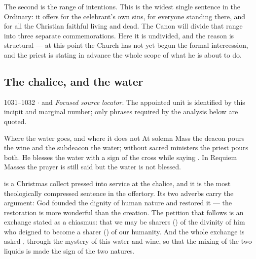 The second is the range of intentions. This is the widest single sentence in
the Ordinary: it offers for the celebrant's own sins, for everyone standing
there, and for all the Christian faithful living and dead. The Canon will
divide that range into three separate commemorations. Here it is undivided, and
the reason is structural --- at this point the Church has not yet begun the
formal intercession, and the priest is stating in advance the whole scope of
what he is about to do.

\subsection*{The chalice, and the water}

\begin{appointed}{1031--1032 $\cdot$  and }
\textit{Focused source locator.} The appointed unit is identified by this incipit and marginal number; only phrases required by the analysis below are quoted.
\end{appointed}

\begin{rubricnote}{Where the water goes, and where it does not}
At solemn Mass the deacon pours the wine and the subdeacon the water; without
sacred ministers the priest pours both. He blesses the water with a sign of the
cross while saying . In Requiem Masses
the prayer is still said but the water is not blessed.
\end{rubricnote}

 is a Christmas collect pressed into
service at the chalice, and it is the most theologically compressed sentence in
the offertory. Its two adverbs carry the argument: God founded the dignity of
human nature  and restored it  ---
the restoration is more wonderful than the creation. The petition that follows
is an exchange stated as a chiasmus: that we may be sharers
() of the divinity of him who deigned to become a sharer
() of our humanity. And the whole exchange is asked
, through the mystery of this water
and wine, so that the mixing of the two liquids is made the sign of the two
natures.

